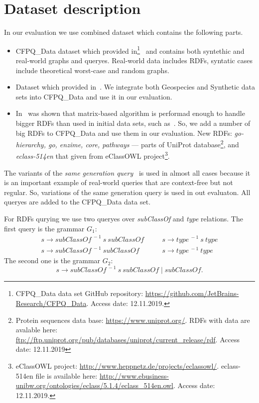 \section{Dataset description}

In our evaluation we use combined dataset which contains the following parts.
\begin{itemize}
\item CFPQ\_Data dataset which provided in\footnote{CFPQ\_Data data set GitHub repository: \url{https://github.com/JetBrains-Research/CFPQ_Data}. Access date: 12.11.2019.}~\cite{Mishin:2019:ECP:3327964.3328503} and contains both syntethic and real-world graphs and queryes.
Real-world data includes RDFs, syntatic cases include theoretical worst-case and random graphs.
\item Dataset which provided in~\cite{Kuijpers:2019:ESC:3335783.3335791}. We integrate both Geospecies and Synthetic data sets into CFPQ\_Data and use it in our evaluation.
\item In~\cite{Mishin:2019:ECP:3327964.3328503} was shown that matrix-based algorithm is performad enough to handle bigger RDFs than used in initial data sets, such as~\cite{RDF}.
So, we add a number of big RDFs to CFPQ\_Data and use them in our evaluation.
New RDFs: \textit{go-hierarchy, go, enzime, core, pathways} --- parts of UniProt database\footnote{Protein sequences data base: \url{https://www.uniprot.org/}. RDFs with data are avalable here: \url{ftp://ftp.uniprot.org/pub/databases/uniprot/current_release/rdf}. Access date: 12.11.2019}, and \textit{eclass-514en} that given from eClassOWL project\footnote{eClassOWL project: \url{http://www.heppnetz.de/projects/eclassowl/}. eclass-514en file is available here: \url{http://www.ebusiness-unibw.org/ontologies/eclass/5.1.4/eclass_514en.owl}. Access date: 12.11.2019.}.
\end{itemize}

The variants of the \textit{same generation query}~\cite{FndDB} is used in almost all cases because it is an important example of real-world queries that are context-free but not regular.
So, variations of the same generation query is used in out evaluaton.
All queryes are added to the CFPQ\_Data data set.

For RDFs qurying we use two queryes over \textit{subClassOf} and \textit{type} relations.
The first query is the grammar $G_1$:
\[
 \begin{array}{lcl}
   s  \rightarrow \textit{subClassOf}^{\ -1} \ s \ \textit{subClassOf}   & \quad & s  \rightarrow \textit{type}^{\ -1} \ s \ \textit{type}     \\
   s  \rightarrow \textit{subClassOf}^{\ -1} \ \textit{subClassOf}       & \quad & s  \rightarrow  \textit{type}^{\ -1}  \ \textit{type}

 \end{array}
 \]
The second one is the grammar $G_2$: $$s \rightarrow \textit{subClassOf}^{\ -1} \ s \ \textit{subClassOf} \mid  \textit{subClassOf}.$$

